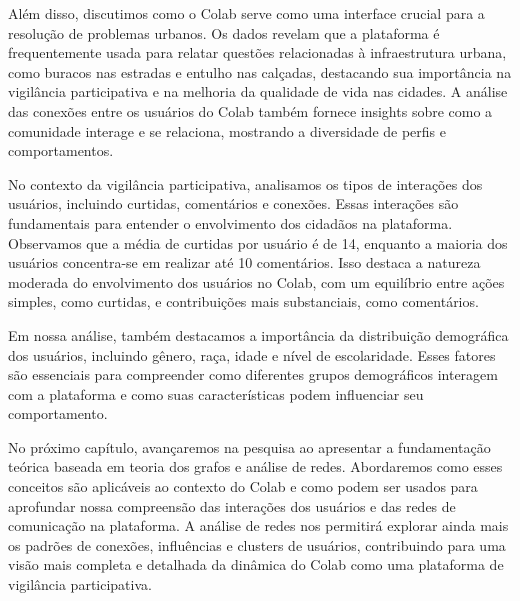 Além disso, discutimos como o Colab serve como uma interface crucial para a resolução de problemas urbanos. Os dados revelam que a plataforma é frequentemente usada para relatar questões relacionadas à infraestrutura urbana, como buracos nas estradas e entulho nas calçadas, destacando sua importância na vigilância participativa e na melhoria da qualidade de vida nas cidades. A análise das conexões entre os usuários do Colab também fornece insights sobre como a comunidade interage e se relaciona, mostrando a diversidade de perfis e comportamentos.

No contexto da vigilância participativa, analisamos os tipos de interações dos usuários, incluindo curtidas, comentários e conexões. Essas interações são fundamentais para entender o envolvimento dos cidadãos na plataforma. Observamos que a média de curtidas por usuário é de 14, enquanto a maioria dos usuários concentra-se em realizar até 10 comentários. Isso destaca a natureza moderada do envolvimento dos usuários no Colab, com um equilíbrio entre ações simples, como curtidas, e contribuições mais substanciais, como comentários.

Em nossa análise, também destacamos a importância da distribuição demográfica dos usuários, incluindo gênero, raça, idade e nível de escolaridade. Esses fatores são essenciais para compreender como diferentes grupos demográficos interagem com a plataforma e como suas características podem influenciar seu comportamento.

No próximo capítulo, avançaremos na pesquisa ao apresentar a fundamentação teórica baseada em teoria dos grafos e análise de redes. Abordaremos como esses conceitos são aplicáveis ao contexto do Colab e como podem ser usados para aprofundar nossa compreensão das interações dos usuários e das redes de comunicação na plataforma. A análise de redes nos permitirá explorar ainda mais os padrões de conexões, influências e clusters de usuários, contribuindo para uma visão mais completa e detalhada da dinâmica do Colab como uma plataforma de vigilância participativa.